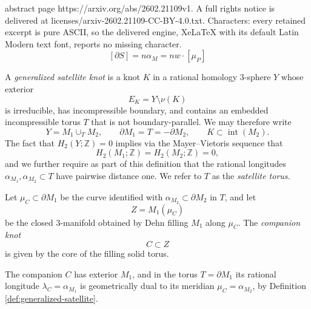 \documentclass[10pt,a4paper]{amsart}
\newcommand{\Z}{\mathbb{Z}}
\newcommand{\inr}{\operatorname{int}}
\begin{document}
abstract page https://arxiv.org/abs/2602.21109v1. A full rights notice is delivered at licenses/arxiv-2602.21109-CC-BY-4.0.txt. Characters: every retained excerpt is pure ASCII, so the delivered engine, XeLaTeX with its default Latin Modern text font, reports no missing character.
\begin{equation} \label{eq:rational-longitude-vs-muP}
[\partial S]=n \alpha_M = nw \cdot [\mu_P]
\end{equation}

\begin{definition}\label{def:generalized-satellite}
A \emph{generalized satellite knot} is a knot $K$ in a rational homology 3-sphere $Y$ whose exterior
\[ E_K = Y \setminus \nu(K) \]
is irreducible, has incompressible boundary, and contains an embedded incompressible torus $T$ that is not boundary-parallel.  We may therefore write
\[ Y = M_1 \cup_T M_2, \qquad \partial M_1 = T = -\partial M_2,\qquad K \subset \inr(M_2). \]
The fact that $H_2(Y;\Z)=0$ implies via the Mayer--Vietoris sequence that
\begin{equation} \label{eq:h2-satellite}
H_2(M_1;\Z) = H_2(M_2;\Z) = 0,
\end{equation}
and we further require as part of this definition that the rational longitudes $\alpha_{M_1}, \alpha_{M_2} \subset T$ have pairwise distance one. We  refer to $T$ as the \emph{satellite torus.}
\end{definition}

\begin{definition} \label{def:generalized-companion}
Let $\mu_C \subset \partial M_1$ be the curve identified with $\alpha_{M_2} \subset \partial M_2$ in $T$, and let
\[ Z = M_1(\mu_C) \]
be the closed 3-manifold obtained by Dehn filling $M_1$ along $\mu_C$.  The \emph{companion knot} \[C \subset Z\] is given by the core of the filling solid torus.
\end{definition}

\begin{remark}\label{rmk:dual}
The companion $C$ has exterior $M_1$, and in the torus $T = \partial M_1$ its rational longitude $\lambda_C = \alpha_{M_1}$ is geometrically dual to its meridian $\mu_C = \alpha_{M_2}$, by Definition \ref{def:generalized-satellite}.
\end{remark}
\end{document}
